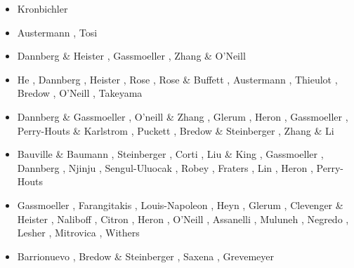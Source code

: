 \begin{itemize}
\begin{scriptsize}
\begin{itemize}
\item[\twothousandtwelve] Kronbichler \etal \cite{krhb12}
\item[\twothousandfifteen] Austermann \etal \cite{aupm15}, Tosi \etal \cite{tosn15}
\item[\twothousandsixteen] Dannberg \& Heister \cite{dahe16}, Gassmoeller \etal \cite{gadb16}, 
                           Zhang \& O'Neill \cite{zhon16}
\item[\twothousandseventeen] He \etal \cite{hepb17}, Dannberg \etal \cite{daef17}, 
                             Heister \etal \cite{hedg17}, Rose \etal \cite{robh17}, 
                             Rose \& Buffett \cite{robu17}, Austermann \etal \cite{aumh17},
                             Thieulot \cite{thie17}, Bredow \etal \cite{brsg17}, 
                             O'Neill \etal \cite{onmz17}, Takeyama \etal \cite{tasm17}
\item[\twothousandeighteen] Dannberg \& Gassmoeller \cite{daga18}, O'neill \& Zhang \cite{onzh18}, 
                            Glerum \etal \cite{gltf18}, Heron \etal \cite{heps18}, 
                            Gassmoeller \etal \cite{galh18}, 
                            Perry-Houts \& Karlstrom \cite{peka18}, Puckett \etal \cite{puth18},
                            Bredow \& Steinberger \cite{brst18b}, Zhang \& Li \cite{zhli18}
\item[\twothousandnineteen] Bauville \& Baumann \cite{baba19}, Steinberger \etal \cite{stbl19}, 
                            Corti \etal \cite{cocf19}, Liu \& King \cite{liki19}, 
                            Gassmoeller \etal \cite{galb19}, Dannberg \etal \cite{dagg19},
                            Njinju \etal \cite{njas19}, Sengul-Uluocak \etal \cite{sepg19}, 
                            Robey \etal \cite{ropu19}, Fraters \etal \cite{frtv19,frbt19},
                            Lin \etal \cite{lixs19}, Heron \etal \cite{hepm19},
                            Perry-Houts \cite{perr19}
\item[\twothousandtwenty] Gassmoeller \etal \cite{gadb20}, Farangitakis \etal \cite{fahm20}, 
                          Louis-Napoleon \etal \cite{logb20}, Heyn \etal \cite{hect20,hect20b}, 
                          Glerum \etal \cite{glbs20}, Clevenger \& Heister \cite{clhe20}, 
                          Naliboff \etal \cite{nagb20}, Citron \etal \cite{cilw20},
                          Heron \etal \cite{hemn20}, O'Neill \etal \cite{onlw20}, 
                          Assanelli \etal \cite{aslr20}, Muluneh \etal \cite{mubi20},
                          Negredo \etal \cite{nemc20}, Lesher \etal \cite{ledb20},
                          Mitrovica \etal \cite{miac20}, Withers \cite{with20}
\item[\twothousandtwentyone] Barrionuevo \etal \cite{balm21}, Bredow \& Steinberger \cite{brst21},
                             Saxena \etal \cite{sacp21}, Grevemeyer \etal \cite{grrm21}
\end{itemize}
\end{scriptsize}


\end{itemize}
